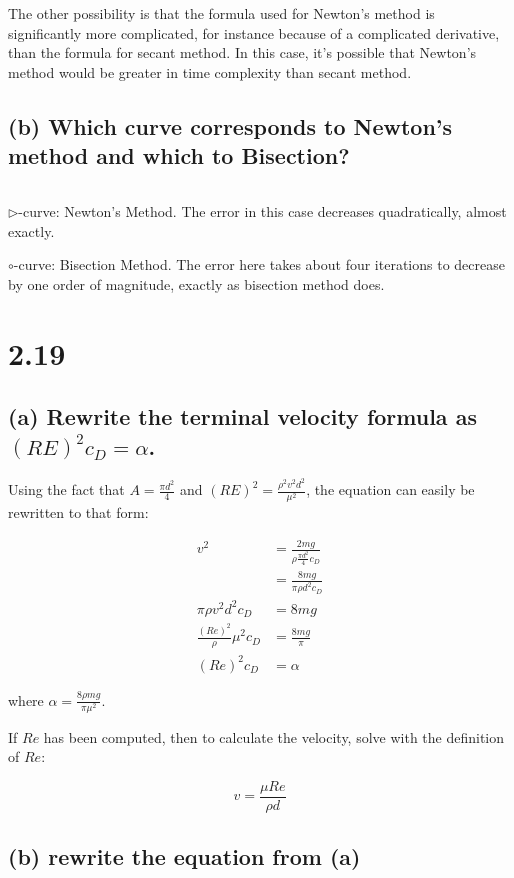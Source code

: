 \documentclass{article}[12pt]
\begin{document}
The other possibility is that the formula used for Newton's method is significantly more complicated, for instance because of a complicated derivative, than the formula for secant method. In this case, it's possible that Newton's method would be greater in time complexity than secant method.

\subsection*{(b) \normalsize Which curve corresponds to Newton's method and which to Bisection?}

$ $

$\rhd$-curve: Newton's Method. The error in this case decreases quadratically, almost exactly.

$\circ$-curve: Bisection Method. The error here takes about four iterations to decrease by one order of magnitude, exactly as bisection method does. 

\section*{2.19}

\subsection*{(a) \normalsize Rewrite the terminal velocity formula as $(RE)^2 c_D = \alpha$.}

Using the fact that $A = \frac{\pi d^2}{4}$ and $(RE)^2 = \frac{\rho^2 v^2 d^2}{\mu^2}$, the equation can easily be rewritten to that form:

\begin{align*}
  v^2 &= \frac{2mg}{\rho \frac{\pi d^2}{4} c_D} \\
  &= \frac{8mg}{\pi \rho d^2 c_D} \\
  \pi \rho v^2 d^2 c_D &= 8mg \\
  \frac{(Re)^2}{\rho}\mu^2 c_D &= \frac{8mg}{\pi} \\
  (Re)^2 c_D &= \alpha
\end{align*}

where $\alpha = \frac{8 \rho mg}{\pi \mu^2}$.

\noindent If $Re$ has been computed, then to calculate the velocity, solve with the definition of $Re$:

$$v = \frac{\mu Re}{\rho d}$$

\subsection*{(b) \normalsize rewrite the equation from (a)}
\end{document}
